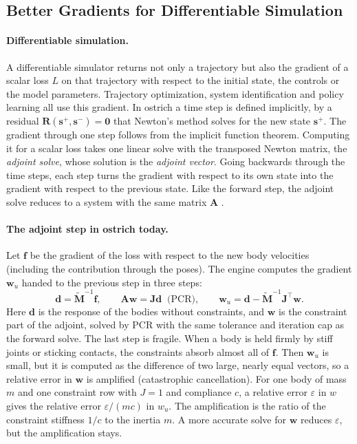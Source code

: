 \subsection{Better Gradients for Differentiable Simulation}
\label{sec:body-space-adjoint}

\paragraph{Differentiable simulation.}
A differentiable simulator returns not only a trajectory but also the
gradient of a scalar loss $L$ on that trajectory with respect to the
initial state, the controls or the model parameters. Trajectory
optimization, system identification and policy learning all use this
gradient. In ostrich a time step is defined implicitly, by a residual
$\mathbf{R}(\mathbf{s}^+, \mathbf{s}^-) = \mathbf{0}$ that Newton's method
solves for the new state $\mathbf{s}^+$. The gradient through one step
follows from the implicit function theorem. Computing it for a scalar loss
takes one linear solve with the transposed Newton matrix, the
\emph{adjoint solve}, whose solution is the \emph{adjoint vector}. Going
backwards through the time steps, each step turns the gradient with respect
to its own state into the gradient with respect to the previous state. Like
the forward step, the adjoint solve reduces to a system with the same
matrix $\mathbf{A}$ \citep[eq.~(18)]{kucera2026ostrich}.

\paragraph{The adjoint step in ostrich today.}
Let $\mathbf{f}$ be the gradient of the loss with respect to the new body
velocities (including the contribution through the poses). The engine
computes the gradient $\mathbf{w}_u$ handed to the previous step in three
steps:
\begin{equation}
  \mathbf{d} = \tilde{\mathbf{M}}^{-1}\mathbf{f}, \qquad
  \mathbf{A}\mathbf{w} = \mathbf{J}\mathbf{d} \;\;\text{(PCR)}, \qquad
  \mathbf{w}_u = \mathbf{d} - \tilde{\mathbf{M}}^{-1}\mathbf{J}^\top\mathbf{w} .
  \label{eq:adjoint-pcr}
\end{equation}
Here $\mathbf{d}$ is the response of the bodies without constraints, and
$\mathbf{w}$ is the constraint part of the adjoint, solved by PCR with the
same tolerance and iteration cap as the forward solve. The last step is
fragile. When a body is held firmly by stiff joints or sticking contacts,
the constraints absorb almost all of $\mathbf{f}$. Then $\mathbf{w}_u$ is
small, but it is computed as the difference of two large, nearly equal
vectors, so a relative error in $\mathbf{w}$ is amplified (catastrophic
cancellation). For one body of mass $m$ and one constraint row with
$J = 1$ and compliance $c$, a relative error $\varepsilon$ in $w$ gives
the relative error $\varepsilon/(mc)$ in $w_u$. The amplification is the
ratio of the constraint stiffness $1/c$ to the inertia $m$. A more accurate
solve for $\mathbf{w}$ reduces $\varepsilon$, but the amplification stays.

